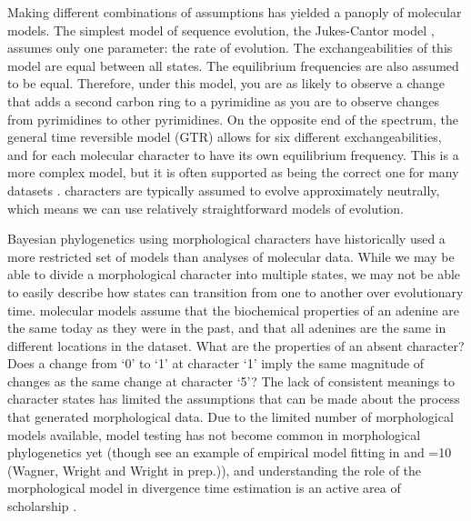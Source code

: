 Making different combinations of assumptions has yielded a panoply of molecular models.
The simplest model of sequence evolution, the Jukes-Cantor model \citep{Jukes1969}, assumes only one parameter: the rate of evolution.
The exchangeabilities of this model are equal between all states.
The equilibrium frequencies are also assumed to be equal.
Therefore, under this model, you are as likely to observe a change that adds a second carbon ring to a pyrimidine as you are to observe changes from pyrimidines to other pyrimidines.
On the opposite end of the spectrum, the general time reversible model (GTR) \citep{Tavare1986} allows for six different exchangeabilities, and for each molecular character to have its own equilibrium frequency.
This is a more complex model, but it is often supported as being the correct one for many datasets \citep{abadi2019}.
 characters are typically assumed to evolve approximately neutrally, which means we can use relatively straightforward models of evolution.

Bayesian phylogenetics using morphological characters have historically used a more restricted set of models than analyses of molecular data.
While we may be able to divide a  morphological character into multiple states, we may not be able to easily describe how states can transition from one to another over evolutionary time.
 molecular models assume that the biochemical properties of an adenine are the same today as they were in the past, and
that all adenines are the same in different locations in the dataset.
What are the properties of an absent  character?
Does a change from  `0' to `1' at character `1' imply the same magnitude of changes as the same change  at character `5'?
The lack of consistent meanings to character states has limited the assumptions that can be made about the process that generated morphological data.
Due to the limited number of morphological models available, model testing has not become common in morphological phylogenetics yet (though see an example of empirical model fitting in \cite*{bapst2017} and \ifnum\value{num}=10 {(Wagner, Wright and Wright in prep.)}\fi),
and understanding the role of the morphological model in divergence time estimation is an active area of scholarship \citep{Klopfstein2019}.

